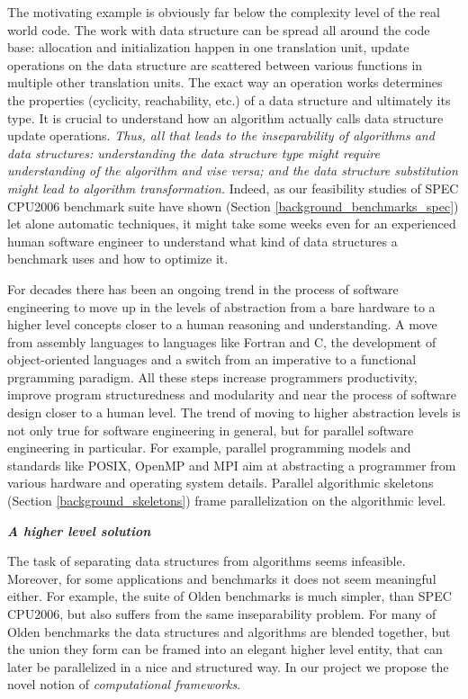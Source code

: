 \begin{description}[style=unboxed,leftmargin=0cm]
\item[\textit{Data structure and algorithm inseparability}] The motivating example is obviously far below the complexity level of the real world code. The work with data structure can be spread all around the code base: allocation and initialization happen in one translation unit, update operations on the data structure are scattered between various functions in multiple other translation units. The exact way an operation works determines the properties (cyclicity, reachability, etc.) of a data structure and ultimately its type. It is crucial to understand how an algorithm actually calls data structure update operations. \textit{Thus, all that leads to the inseparability of algorithms and data structures: understanding the data structure type might require understanding of the algorithm and vise versa; and the data structure substitution might lead to algorithm transformation.} Indeed, as our feasibility studies of SPEC CPU2006 benchmark suite have shown (Section \ref{background_benchmarks_spec}) let alone automatic techniques, it might take some weeks even for an experienced human software engineer to understand what kind of data structures a benchmark uses and how to optimize it.
\item[\textit{The ever-going trend to higher abstraction levels}] For decades there has been an ongoing trend in the process of software engineering to move up in the levels of abstraction from a bare hardware to a higher level concepts closer to a human reasoning and understanding. A move from assembly languages to languages like Fortran and C, the development of object-oriented languages and a switch from an imperative to a functional prgramming paradigm. All these steps increase programmers productivity, improve program structuredness and modularity and near the process of software design closer to a human level. The trend of moving to higher abstraction levels is not only true for software engineering in general, but for parallel software engineering in particular. For example, parallel programming models and standards like POSIX, OpenMP and MPI aim at abstracting a programmer from various hardware and operating system details. Parallel algorithmic skeletons (Section \ref{background_skeletons}) frame parallelization on the algorithmic level.
\end{description}
\begin{center}
\textbf{\large \textit{A higher level solution}}
\end{center}
\quad The task of separating data structures from algorithms seems infeasible. Moreover, for some applications and benchmarks it does not seem meaningful either. For example, the suite of Olden benchmarks is much simpler, than SPEC CPU2006, but also suffers from the same inseparability problem. For many of Olden benchmarks the data structures and algorithms are blended together, but the union they form can be framed into an elegant higher level entity, that can later be parallelized in a nice and structured way.\newline\null
\quad In our project we propose the novel notion of \textit{computational frameworks}.



